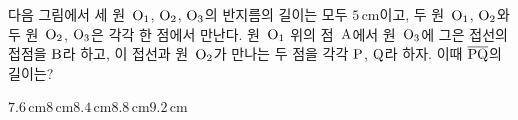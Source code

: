 다음 그림에서 세 원~$\mathrm{O_1}$, $\mathrm{O_2}$, $\mathrm{O_3}$의 반지름의 길이는 모두 $5\,\mathrm{cm}$이고, 두 원~$\mathrm{O_1}$, $\mathrm{O_2}$와 두 원~$\mathrm{O_2}$, $\mathrm{O_3}$은 각각 한 점에서 만난다. 원~$\mathrm{O_1}$ 위의 점~$\mathrm{A}$에서 원~$\mathrm{O_3}$에 그은 접선의 접점을 $\mathrm{B}$라 하고, 이 접선과 원~$\mathrm{O_2}$가 만나는 두 점을 각각 $\mathrm{P}$, $\mathrm{Q}$라 하자. 이때 $\overline{\mathrm{PQ}}$의 길이는? 
\par\smallskip\begin{center}\resizebox{\ifdim\width>\linewidth\linewidth\else\width\fi}{!}{}\end{center}
\begin{choices32}{$7.6\,\mathrm{cm}$}{$8\,\mathrm{cm}$}{$8.4\,\mathrm{cm}$}{$8.8\,\mathrm{cm}$}{$9.2\,\mathrm{cm}$}\end{choices32}
